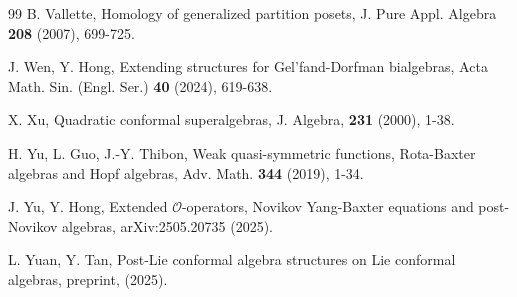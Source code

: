 \documentclass[12pt]{amsart}
\begin{document}
\begin{thebibliography}{99}
B. Vallette, Homology of generalized partition posets, J. Pure
Appl. Algebra {\bf 208} (2007), 699-725.

J. Wen, Y. Hong, Extending structures for Gel'fand-Dorfman
bialgebras, Acta Math. Sin. (Engl. Ser.) {\bf 40} (2024), 619-638.







X. Xu, Quadratic conformal superalgebras, J. Algebra, {\bf 231} (2000), 1-38.


H. Yu, L. Guo,  J.-Y. Thibon, Weak quasi-symmetric functions,
Rota-Baxter algebras and Hopf algebras, Adv. Math. {\bf344}
(2019), 1-34.

J. Yu, Y. Hong, Extended $\mathcal{O}$-operators, Novikov Yang-Baxter equations and post-Novikov algebras,  arXiv:2505.20735 (2025).

 L. Yuan, Y. Tan, Post-Lie conformal algebra structures on Lie conformal algebras, preprint, (2025).














\end{thebibliography}
\end{document}
